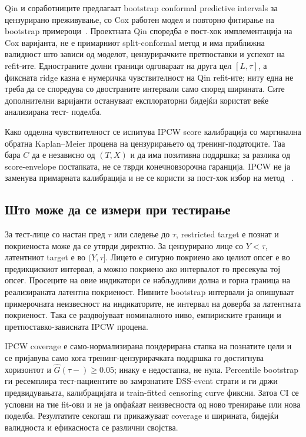 \documentclass[12pt]{article}
\begin{document}
Qin и соработниците предлагаат bootstrap conformal predictive intervals за
цензурирано преживување, со Cox работен модел и повторно фитирање на bootstrap
примероци~\cite{qin2025}. Проектната Qin споредба е пост-хок имплементација на
Cox варијанта, не е примарниот split-conformal метод и има приближна валидност
што зависи од моделот, цензурирачките претпоставки и успехот на refit-ите.
Едностраните долни граници одговараат на друга цел $[L,\tau]$, а фиксната ridge
казна е нумеричка чувствителност на Qin refit-ите; ниту една не треба да се
споредува со двостраните интервали само според ширината. Сите дополнителни
варијанти остануваат експлораторни бидејќи користат веќе анализирана тест-
поделба.

Како одделна чувствителност се испитува IPCW score калибрација со маргинална
обратна Kaplan--Meier процена на цензурирањето од тренинг-податоците. Таа бара
$C$ да е независно од $(T,X)$ и да има позитивна поддршка; за разлика од
score-envelope постапката, не се тврди конечновзорочна гаранција. IPCW не ја
заменува примарната калибрација и не се користи за пост-хок избор на метод
~\cite{candes2023,qin2025}.

\subsection{Што може да се измери при тестирање}

За тест-лице со настан пред $\tau$ или следење до $\tau$, restricted target е
познат и покриеноста може да се утврди директно. За цензурирано лице со $Y<\tau$,
латентниот target е во $(Y,\tau]$. Лицето е сигурно покриено ако целиот опсег е
во предикцискиот интервал, а можно покриено ако интервалот го пресекува тој
опсег. Просеците на овие индикатори се набљудливи долна и горна граница на
реализираната латентна покриеност. Нивните bootstrap интервали ја опишуваат
примерочната неизвесност на индикаторите, не интервал на доверба за латентната
покриеност. Така се раздвојуваат номиналното ниво, емпириските граници и
претпоставко-зависната IPCW процена.

IPCW coverage е само-нормализирана пондерирана стапка на познатите цели и се
пријавува само кога тренинг-цензурирачката поддршка го достигнува хоризонтот и
$\widehat G(\tau-)\geq0.05$; инаку е недостапна, не нула. Percentile bootstrap
ги ресемплира тест-пациентите во замрзнатите DSS-event страти и ги држи
предвидувањата, калибрацијата и train-fitted censoring curve фиксни. Затоа CI
се условни на тие fit-ови и не ја опфаќаат неизвесноста од ново тренирање или
нова поделба. Резултатите секогаш ги прикажуваат coverage и ширината, бидејќи
валидноста и ефикасноста се различни својства.
\end{document}
